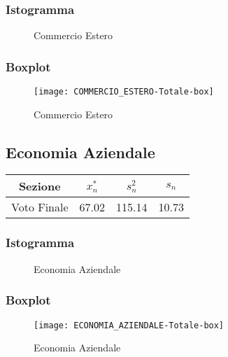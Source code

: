 \subsubsection{Istogramma}
\begin{figure}[!h]
  \caption{Commercio Estero}
\end{figure}

\subsubsection{Boxplot}
\begin{figure}[!h]
  \centering
  \texttt{[image: COMMERCIO\_ESTERO-Totale-box]}
  \caption{Commercio Estero}
\end{figure}
\restoregeometry
\clearpage

\thispagestyle{empty} %
\subsection{Economia Aziendale}

\begin{center}
\begin{tabular}{|c|c|c|c|}
  \hline
  Sezione & \(x_{n}^{*}\) & \(s_n^2\) & \(s_n\) \\
  \hline
  Voto Finale & 67.02 & 115.14 & 10.73 \\
  \hline
\end{tabular}
\end{center}

\subsubsection{Istogramma}
\begin{figure}[!h]
  \caption{Economia Aziendale}
\end{figure}

\subsubsection{Boxplot}
\begin{figure}[!h]
  \centering
  \texttt{[image: ECONOMIA\_AZIENDALE-Totale-box]}
  \caption{Economia Aziendale}
\end{figure}
\restoregeometry
\clearpage

